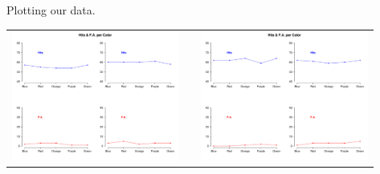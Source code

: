\documentclass[final]{beamer}
\newlength{\sepwid}
\newlength{\onecolwid}
\newlength{\twocolwid}
\begin{document}
\begin{frame}[t]
\begin{columns}[t]
\begin{column}{\twocolwid}
\begin{columns}[t,totalwidth=\twocolwid]
\begin{column}{\onecolwid}
\begin{alertblock}{Plotting our data.}
\begin{itemize}
\begin{center}
\begin{tabular}{ccc}
\includegraphics[width=0.35\linewidth]{Figures/8_Color.pdf} & \hfill & \includegraphics[width=0.35\linewidth]{Figures/8_Colors.pdf}
\end{tabular}
\end{center}



\end{itemize}
\end{alertblock}






\end{column} %

\setlength{\onecolwid}{0.21\paperwidth}
\begin{column}{\sepwid}\end{column} %
\begin{column}{\onecolwid}\vspace{-2.1in} %


\begin{itemize}
\item
\item
\end{itemize}




\end{column}
\end{columns}
\end{column}
\end{columns}
\end{frame}
\end{document}
